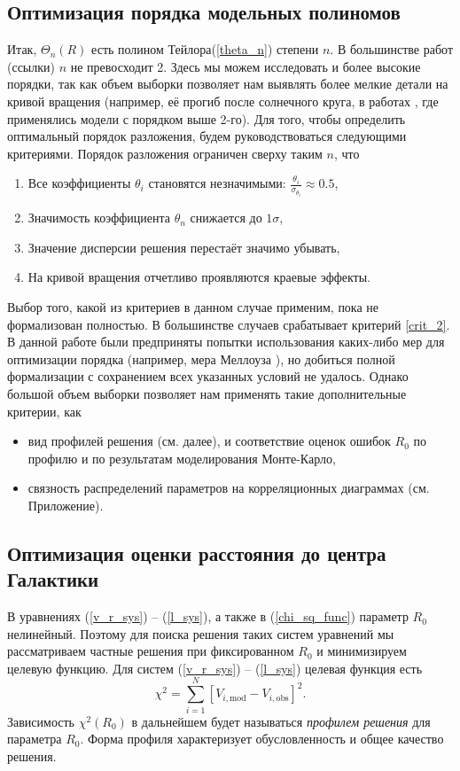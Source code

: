\documentclass{matmex-diploma-custom}
\begin{document}
\subsection{Оптимизация порядка модельных полиномов}
Итак, $\Theta_n(R)$ есть полином Тейлора(\ref{theta_n}) степени $n$. В большинстве работ (ссылки) $n$ не превосходит 2. Здесь мы можем исследовать и более высокие порядки, так как объем выборки позволяет нам выявлять более мелкие детали на кривой вращения (например, её прогиб после солнечного круга, в работах \cite{Rastorguev} \cite{Baikbob}, где применялись модели с порядком выше 2-го). Для того, чтобы определить оптимальный порядок разложения, будем руководствоваться следующими критериями.
Порядок разложения ограничен сверху таким $n$, что
\begin{enumerate}
        \item Все коэффициенты $\theta_i$ становятся незначимыми: $\frac{\theta_i}{\sigma_{\theta_i}}\approx 0.5$, \label{crit_1}
        \item Значимость коэффициента $\theta_n$ снижается до $1 \sigma$,  \label{crit_2}
        \item Значение дисперсии решения перестаёт значимо убывать, \label{crit_3}
        \item На кривой вращения отчетливо проявляются краевые эффекты. \label{crit_4}
\end{enumerate}

Выбор того, какой из критериев в данном случае применим, пока не формализован полностью. В большинстве случаев срабатывает критерий \ref{crit_2}. В данной работе были предприняты попытки использования каких-либо мер для оптимизации порядка (например, мера Меллоуза \cite{Valeev}), но добиться полной формализации с сохранением всех указанных условий не удалось. Однако большой объем выборки позволяет нам применять такие дополнительные критерии, как 
\begin{itemize}
        \item вид профилей решения (см. далее), и соответствие оценок ошибок $R_0$ по профилю и по результатам моделирования Монте-Карло,
        \item связность распределений параметров на корреляционных диаграммах (см. Приложение).
\end{itemize}

\subsection{Оптимизация оценки расстояния до центра Галактики}
В уравнениях (\ref{v_r_sys}) -- (\ref{l_sys}), а также в (\ref{chi_sq_func}) параметр $R_0$ нелинейный. Поэтому для поиска решения таких систем уравнений мы рассматриваем частные решения при фиксированном $R_0$ и минимизируем целевую функцию. Для систем (\ref{v_r_sys}) -- (\ref{l_sys}) целевая функция есть
\begin{equation}
        \chi^2 = \sum_{i=1}^{N} \left [ V_{i, \mathrm{mod}} - V_{i, \mathrm{obs}} \right ]^2.
\end{equation}
Зависимость $\chi^2(R_0)$ в дальнейшем будет называться \textit{профилем решения} для параметра $R_0$. Форма профиля характеризует обусловленность и общее качество решения.
\end{document}
